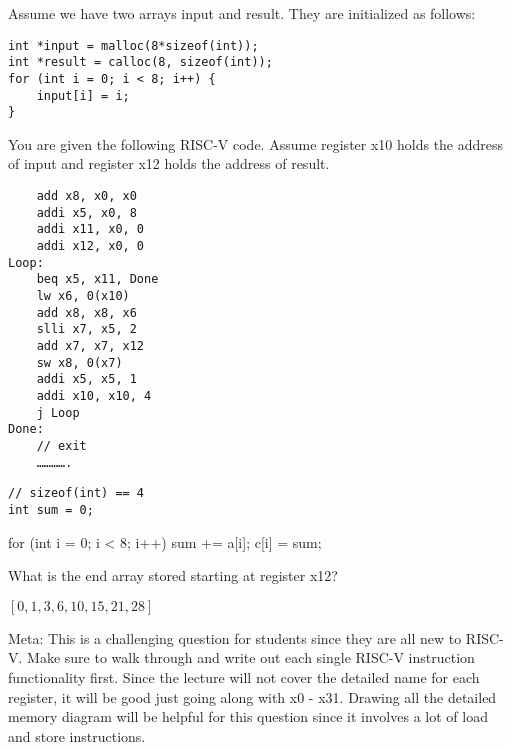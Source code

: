 \begin{blocksection}
\question Assume we have two arrays input and result. They are initialized as follows:

\begin{verbatim}
int *input = malloc(8*sizeof(int));
int *result = calloc(8, sizeof(int));
for (int i = 0; i < 8; i++) {
    input[i] = i;
}
\end{verbatim}

You are given the following RISC-V code. Assume register x10 holds the address of input and register x12 holds the address of result.

\begin{verbatim}
    add x8, x0, x0
    addi x5, x0, 8
    addi x11, x0, 0
    addi x12, x0, 0
Loop:
    beq x5, x11, Done
    lw x6, 0(x10)
    add x8, x8, x6
    slli x7, x5, 2
    add x7, x7, x12
    sw x8, 0(x7)
    addi x5, x5, 1
    addi x10, x10, 4
    j Loop
Done:
    // exit
    ………….
\end{verbatim}

\begin{verbatim}
// sizeof(int) == 4
int sum = 0;
\end{verbatim}
\begin{solution}[0.7in]
for (int i = 0; i < 8; i++) {
    sum += a[i];
    c[i] = sum;
}
\end{solution}

\question What is the end array stored starting at register x12?

\begin{solution}
$[0, 1, 3, 6, 10, 15, 21, 28]$

Meta: This is a challenging question for students since they are all new to RISC-V. Make sure to walk through and write out each single RISC-V instruction functionality first. Since the lecture will not cover the detailed name for each register, it will be good just going along with x0 - x31. Drawing all the detailed memory diagram will be helpful for this question since it involves a lot of load and store instructions. 
\end{solution}
\end{blocksection}
